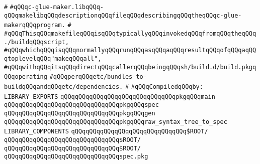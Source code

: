 \label{src/app/c-glue-maker/c-glue-maker.lib}
\verb|#|\newline
\verb|#qQQqc-glue-maker.libqQQq-qQQqmakelibqQQqdescriptionqQQqfileqQQqdescribingqQQqtheqQQqc-glue-makerqQQqprogram.|\newline
\verb|#|\newline
\verb|#qQQqThisqQQqmakefileqQQqisqQQqtypicallyqQQqinvokedqQQqfromqQQqtheqQQq./buildqQQqscript,|\newline
\verb|#qQQqwhichqQQqisqQQqnormallyqQQqrunqQQqasqQQqaqQQqresultqQQqofqQQqaqQQqtoplevelqQQq"makeqQQqall",|\newline
\verb|#qQQqwithqQQqitsqQQqdirectqQQqcallerqQQqbeingqQQqsh/build.d/build.pkgqQQqoperating|\newline
\verb|#qQQqperqQQqetc/bundles-to-buildqQQqandqQQqetc/dependencies.|\newline
\verb|#|\newline
\newline
\verb|#qQQqCompiledqQQqby:|\newline
\newline
\newline
\verb|LIBRARY_EXPORTS|\newline
\newline
\verb|qQQqqQQqqQQqqQQqqQQqqQQqqQQqqQQqpkgqQQqmain|\newline
\verb|qQQqqQQqqQQqqQQqqQQqqQQqqQQqqQQqpkgqQQqspec|\newline
\verb|qQQqqQQqqQQqqQQqqQQqqQQqqQQqqQQqpkgqQQqgen|\newline
\verb|qQQqqQQqqQQqqQQqqQQqqQQqqQQqqQQqpkgqQQqraw_syntax_tree_to_spec|\newline
\newline
\newline
\newline
\verb|LIBRARY_COMPONENTS|\newline
\newline
\verb|qQQqqQQqqQQqqQQqqQQqqQQqqQQqqQQq$ROOT/|\newline
\verb|qQQqqQQqqQQqqQQqqQQqqQQqqQQqqQQq$ROOT/|\newline
\verb|qQQqqQQqqQQqqQQqqQQqqQQqqQQqqQQq$ROOT/|\newline
\newline
\verb|qQQqqQQqqQQqqQQqqQQqqQQqqQQqqQQqspec.pkg|\newline
